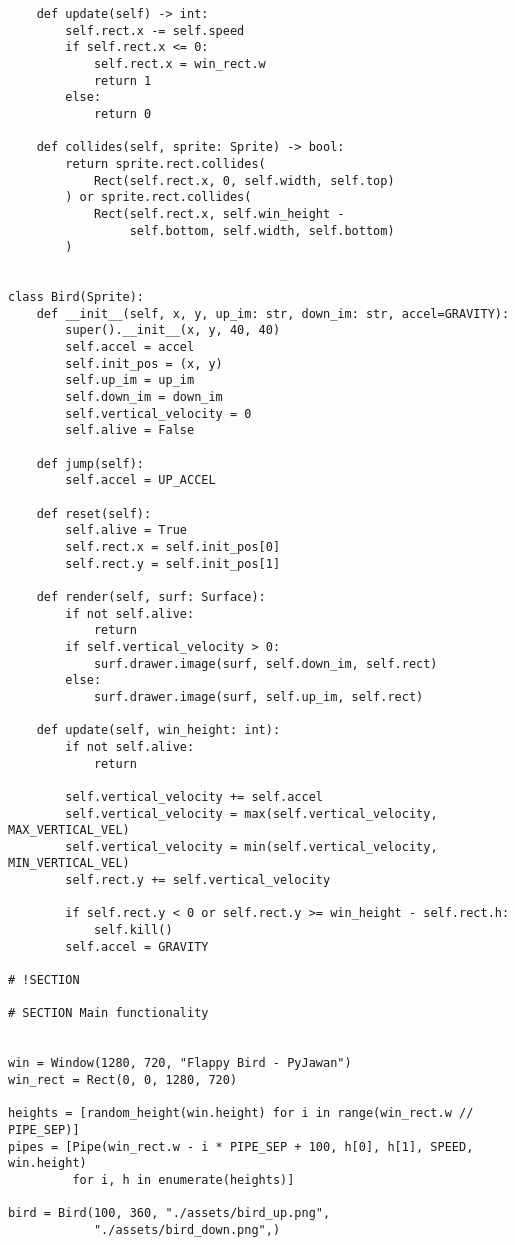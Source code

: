 \documentclass[11pt]{article}
\begin{document}
\begin{lstlisting}
    def update(self) -> int:
        self.rect.x -= self.speed
        if self.rect.x <= 0:
            self.rect.x = win_rect.w
            return 1
        else:
            return 0

    def collides(self, sprite: Sprite) -> bool:
        return sprite.rect.collides(
            Rect(self.rect.x, 0, self.width, self.top)
        ) or sprite.rect.collides(
            Rect(self.rect.x, self.win_height -
                 self.bottom, self.width, self.bottom)
        )


class Bird(Sprite):
    def __init__(self, x, y, up_im: str, down_im: str, accel=GRAVITY):
        super().__init__(x, y, 40, 40)
        self.accel = accel
        self.init_pos = (x, y)
        self.up_im = up_im
        self.down_im = down_im
        self.vertical_velocity = 0
        self.alive = False

    def jump(self):
        self.accel = UP_ACCEL

    def reset(self):
        self.alive = True
        self.rect.x = self.init_pos[0]
        self.rect.y = self.init_pos[1]

    def render(self, surf: Surface):
        if not self.alive:
            return
        if self.vertical_velocity > 0:
            surf.drawer.image(surf, self.down_im, self.rect)
        else:
            surf.drawer.image(surf, self.up_im, self.rect)

    def update(self, win_height: int):
        if not self.alive:
            return

        self.vertical_velocity += self.accel
        self.vertical_velocity = max(self.vertical_velocity, MAX_VERTICAL_VEL)
        self.vertical_velocity = min(self.vertical_velocity, MIN_VERTICAL_VEL)
        self.rect.y += self.vertical_velocity

        if self.rect.y < 0 or self.rect.y >= win_height - self.rect.h:
            self.kill()
        self.accel = GRAVITY

# !SECTION

# SECTION Main functionality


win = Window(1280, 720, "Flappy Bird - PyJawan")
win_rect = Rect(0, 0, 1280, 720)

heights = [random_height(win.height) for i in range(win_rect.w // PIPE_SEP)]
pipes = [Pipe(win_rect.w - i * PIPE_SEP + 100, h[0], h[1], SPEED, win.height)
         for i, h in enumerate(heights)]

bird = Bird(100, 360, "./assets/bird_up.png",
            "./assets/bird_down.png",)



\end{lstlisting}
\end{document}
